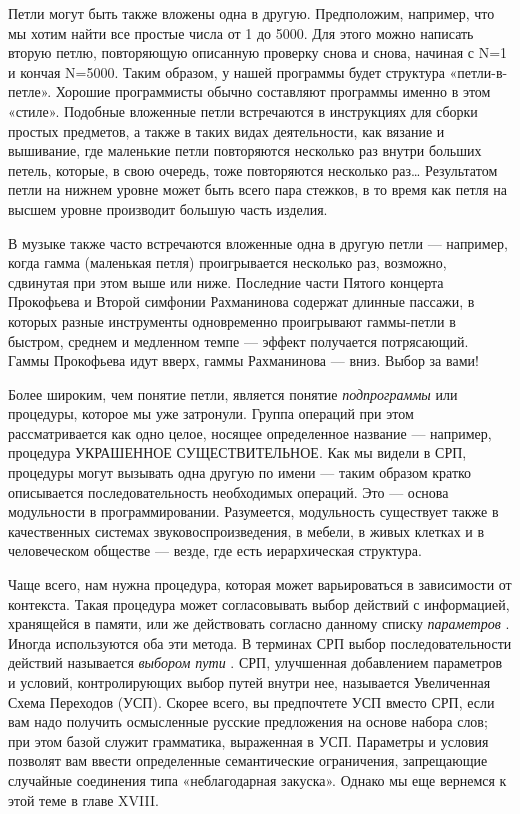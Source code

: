 Петли могут быть также вложены одна в другую. Предположим, например, что мы хотим найти все простые числа от 1 до 5000. Для этого можно написать вторую петлю, повторяющую описанную проверку снова и снова, начиная с N=1 и кончая N=5000. Таким образом, у нашей программы будет структура «петли-в-петле». Хорошие программисты обычно составляют программы именно в этом «стиле». Подобные вложенные петли встречаются в инструкциях для сборки простых предметов, а также в таких видах деятельности, как вязание и вышивание, где маленькие петли повторяются несколько раз внутри больших петель, которые, в свою очередь, тоже повторяются несколько раз\ldots{} Результатом петли на нижнем уровне может быть всего пара стежков, в то время как петля на высшем уровне производит большую часть изделия.

В музыке также часто встречаются вложенные одна в другую петли --- например, когда гамма (маленькая петля) проигрывается несколько раз, возможно, сдвинутая при этом выше или ниже. Последние части Пятого концерта Прокофьева и Второй симфонии Рахманинова содержат длинные пассажи, в которых разные инструменты одновременно проигрывают гаммы-петли в быстром, среднем и медленном темпе --- эффект получается потрясающий. Гаммы Прокофьева идут вверх, гаммы Рахманинова --- вниз. Выбор за вами!

Более широким, чем понятие петли, является понятие \emph{подпрограммы} или процедуры, которое мы уже затронули. Группа операций при этом рассматривается как одно целое, носящее определенное название --- например, процедура УКРАШЕННОЕ СУЩЕСТВИТЕЛЬНОЕ. Как мы видели в СРП, процедуры могут вызывать одна другую по имени --- таким образом кратко описывается последовательность необходимых операций. Это --- основа модульности в программировании. Разумеется, модульность существует также в качественных системах звуковоспроизведения, в мебели, в живых клетках и в человеческом обществе --- везде, где есть иерархическая структура.

Чаще всего, нам нужна процедура, которая может варьироваться в зависимости от контекста. Такая процедура может согласовывать выбор действий с информацией, хранящейся в памяти, или же действовать согласно данному списку \emph{параметров} . Иногда используются оба эти метода. В терминах СРП выбор последовательности действий называется \emph{выбором пути} . СРП, улучшенная добавлением параметров и условий, контролирующих выбор путей внутри нее, называется Увеличенная Схема Переходов (УСП). Скорее всего, вы предпочтете УСП вместо СРП, если вам надо получить осмысленные русские предложения на основе набора слов; при этом базой служит грамматика, выраженная в УСП. Параметры и условия позволят вам ввести определенные семантические ограничения, запрещающие случайные соединения типа «неблагодарная закуска». Однако мы еще вернемся к этой теме в главе XVIII.


